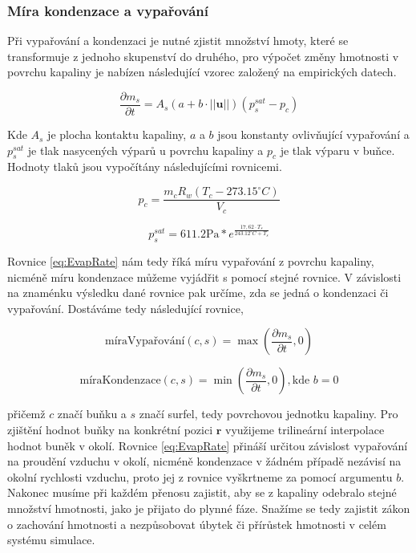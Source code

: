 \subsubsection{Míra kondenzace a vypařování}
Při vypařování a kondenzaci je nutné zjistit množství hmoty, které se transformuje z jednoho skupenství do druhého, pro výpočet změny hmotnosti v povrchu kapaliny je nabízen následující vzorec založený na empirických datech. \cite{SMITH94}

\begin{equation}
    \frac{\partial m_s}{\partial t} = A_s(a + b \cdot ||\mathbf{u}||)(p_s^{sat} - p_c)
    \label{eq:EvapRate}
\end{equation}

Kde $A_s$ je plocha kontaktu kapaliny, $a$ a $b$ jsou konstanty ovlivňující vypařování a $p_s^{sat}$ je tlak nasycených výparů u povrchu kapaliny a $p_c$ je tlak výparu v buňce. Hodnoty tlaků jsou vypočítány následujícími rovnicemi. \cite{yau1996short}

\begin{equation}
    p_c = \frac{m_c R_w(T_c - 273.15^{\circ}C)}{V_c}
\end{equation}

\begin{equation}
    p_s^{sat} = 611.2\text{Pa} * e^{\frac{17,62 \cdot T_s}{243.12^{\circ}C + T_s}}
\end{equation}

Rovnice \ref{eq:EvapRate} nám tedy říká míru vypařování z povrchu kapaliny, nicméně míru kondenzace můžeme vyjádřit s pomocí stejné rovnice. V závislosti na znaménku výsledku dané rovnice pak určíme, zda se jedná o kondenzaci či vypařování. Dostáváme tedy následující rovnice,

\begin{equation}
    \text{míraVypařování}(c,s) = \max(\frac{\partial m_s}{\partial t}, 0)
    \label{eq:EvapTrans}
\end{equation}

\begin{equation}
    \text{míraKondenzace}(c,s) = \min(\frac{\partial m_s}{\partial t}, 0), \text{kde } b = 0
    \label{eq:CondTrans}
\end{equation}

přičemž $c$ značí buňku a $s$ značí surfel, tedy povrchovou jednotku kapaliny. Pro zjištění hodnot buňky na konkrétní pozici $\mathbf{r}$ využijeme trilineární interpolace hodnot buněk v okolí. Rovnice \ref{eq:EvapRate} přináší určitou závislost vypařování na proudění vzduchu v okolí, nicméně kondenzace v žádném případě nezávisí na okolní rychlosti vzduchu, proto jej z rovnice vyškrtneme za pomocí argumentu $b$. Nakonec musíme při každém přenosu zajistit, aby se z kapaliny odebralo stejné množství hmotnosti, jako je přijato do plynné fáze. Snažíme se tedy zajistit zákon o zachování hmotnosti a nezpůsobovat úbytek či přírůstek hmotnosti v celém systému simulace.

